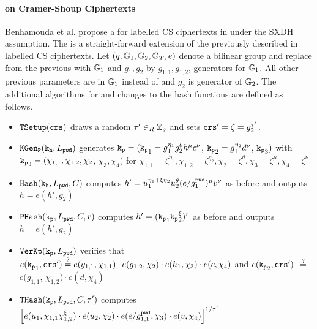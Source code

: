 \paragraph{\TSPHF on Cramer-Shoup Ciphertexts}
Benhamouda et al. propose a \TSPHF for labelled CS ciphertexts in \cite{Benhamouda2013} under the SXDH assumption.
The \TSPHF is a straight-forward extension of the previously described \SPHF in labelled CS ciphertexts.
Let $(q, \mathbb{G}_1, \mathbb{G}_2, \mathbb{G}_T, e)$ denote a bilinear group and replace \GG from the previous \SPHF with $\mathbb{G}_1$ and $g_1,g_2$ by $g_{1,1},g_{1,2}$, generators for $\mathbb{G}_1$.
All other previous parameters are in $\mathbb{G}_1$ instead of \GG and $g_2$ is generator of $\mathbb{G}_2$.
The additional algorithms for \TSPHF and changes to the hash functions are defined as follows.
\begin{itemize}
  \item $\mathtt{TSetup}(\mathtt{crs})$ draws a random $\tau'\in_R\mathbb{Z}_q$ and sets $\mathtt{crs}'=\zeta=g_2^{\tau'}$.
  \item $\mathtt{KGen_P}(\mathtt{k_h}, L_\mathtt{pwd})$ generates $\mathtt{k_p}=(\mathtt{k_p}_1=g_1^{\eta_1} g_2^{\theta} h^\mu c^\nu$, $\mathtt{k_p}_2=g_1^{\eta_2} d^{\nu}$, $\mathtt{k_p}_3)$ with 
      $\mathtt{k_p}_3=(\chi_{1,1}, \chi_{1,2}, \chi_2$, $\chi_3, \chi_4)$ for 
      $\chi_{1,1}={\zeta}^{\eta_1}, \chi_{1,2}={\zeta}^{\eta_2}, \chi_2={\zeta}^{\theta}, \chi_3={\zeta}^{\mu}, \chi_4={\zeta}^{\nu}$
  \item $\mathtt{Hash}(\mathtt{k_h}, L_\mathtt{pwd}, C)$ computes $h'=u_1^{\eta_1+\xi\eta_2} u_2^{\theta} (e/g_1^{\mathtt{pwd}})^\mu v^\nu$ as before and outputs $h=e(h',g_2)$
  \item $\mathtt{PHash}(\mathtt{k_p}, L_\mathtt{pwd}, C, r)$ computes $h'=(\mathtt{k_p}_1 \mathtt{k_p}_2^\xi)^r$ as before and outputs $h=e(h',g_2)$
  \item $\mathtt{VerKp}(\mathtt{k_p}, L_\mathtt{pwd})$ verifies that 
      $e(\mathtt{k_p}_1, \mathtt{crs}')\stackrel{?}{=} e(g_{1,1}, \chi_{1,1})\cdot e(g_{1,2}, \chi_2)\cdot e(h_1, \chi_3)\cdot e(c, \chi_4)$ and
      $e(\mathtt{k_p}_2, \mathtt{crs}')$ $\stackrel{?}{=}$ $e(g_{1,1}$, $\chi_{1,2})\cdot e(d, \chi_4)$
  \item $\mathtt{THash}(\mathtt{k_p}, L_\mathtt{pwd}, C, \tau')$ computes $\left[ e(u_1, \chi_{1,1} \chi_{1,2}^{\xi})\cdot e(u_2, \chi_2)\cdot e(e/g_{1,1}^{\mathtt{pwd}}, \chi_3)\cdot e(v, \chi_4) \right]^{1/\tau'}$
\end{itemize}
